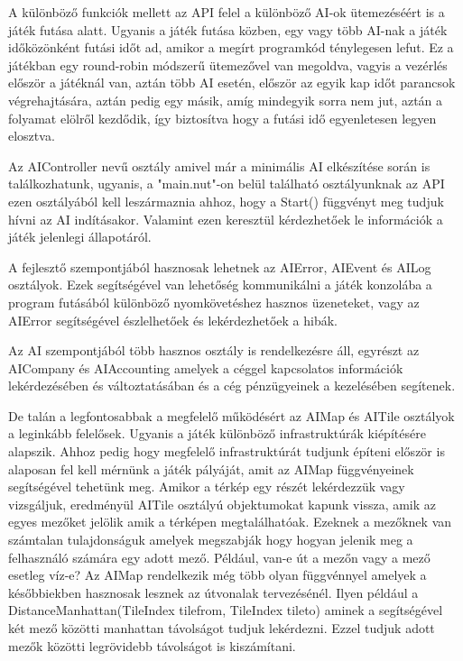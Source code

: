 A különböző funkciók mellett az API felel a különböző AI-ok ütemezéséért is a játék futása alatt. Ugyanis a játék futása közben, egy vagy több AI-nak a játék időközönként futási időt ad, amikor a megírt programkód ténylegesen lefut. Ez a játékban egy round-robin módszerű ütemezővel van megoldva, vagyis a vezérlés először a játéknál van, aztán több AI esetén, először az egyik kap időt parancsok végrehajtására, aztán pedig egy másik, amíg mindegyik sorra nem jut, aztán a folyamat elölről kezdődik, így biztosítva hogy a futási idő egyenletesen legyen elosztva. 

Az AIController nevű osztály amivel már a minimális AI elkészítése során is találkozhatunk, ugyanis, a "main.nut"-on belül található osztályunknak az API ezen osztályából kell leszármaznia ahhoz, hogy a Start() függvényt meg tudjuk hívni az AI indításakor. Valamint ezen keresztül kérdezhetőek le információk a játék jelenlegi állapotáról.

A fejlesztő szempontjából hasznosak lehetnek az AIError, AIEvent és AILog osztályok. Ezek segítségével van lehetőség kommunikálni a játék konzolába a program futásából különböző nyomkövetéshez hasznos üzeneteket, vagy az AIError segítségével észlelhetőek és lekérdezhetőek a hibák.

Az AI szempontjából több hasznos osztály is rendelkezésre áll, egyrészt az AICompany és AIAccounting amelyek a céggel kapcsolatos információk lekérdezésében és változtatásában és a cég pénzügyeinek a kezelésében segítenek.

De talán a legfontosabbak a megfelelő működésért az AIMap és AITile osztályok a leginkább felelősek. Ugyanis a játék különböző infrastruktúrák kiépítésére alapszik. Ahhoz pedig hogy megfelelő infrastruktúrát tudjunk építeni először is alaposan fel kell mérnünk a játék pályáját, amit az AIMap függvényeinek segítségével tehetünk meg. Amikor a térkép egy részét lekérdezzük vagy vizsgáljuk, eredményül AITile osztályú objektumokat kapunk vissza, amik az egyes mezőket jelölik amik a térképen megtalálhatóak. Ezeknek a mezőknek van számtalan tulajdonságuk amelyek megszabják hogy hogyan jelenik meg a felhasználó számára egy adott mező. Például, van-e út a mezőn vagy a mező esetleg víz-e? Az AIMap rendelkezik még több olyan függvénnyel amelyek a későbbiekben hasznosak lesznek az útvonalak tervezésénél. Ilyen például a DistanceManhattan(TileIndex tilefrom, TileIndex tileto) aminek a segítségével két mező közötti manhattan távolságot tudjuk lekérdezni. Ezzel tudjuk adott mezők közötti legrövidebb távolságot is kiszámítani.


